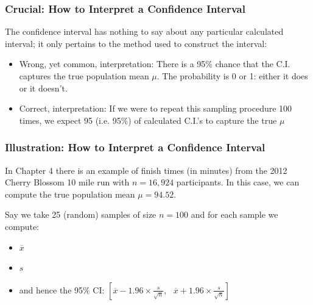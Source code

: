 \documentclass[handout]{beamer}
\newcommand{\blue}[1]{\textcolor{blue2}{#1}}
\newcommand{\xbar}{\overline{x}}
\begin{document}
\begin{frame}
\frametitle{Crucial: How to Interpret a Confidence Interval}
The confidence interval has nothing to say about any particular calculated interval; it only pertains to the \blue{method} used to construct the interval:
\vskip 0.25cm
\begin{itemize}
\pause \item\blue{Wrong, yet common, interpretation}:  There is a 95\% chance that the C.I. captures the true population mean $\mu$.  The probability is 0 or 1: either it does or it doesn't.  
\pause \item\blue{Correct, interpretation}:  If we were to repeat this sampling procedure 100 times, we expect 95 (i.e. 95\%) of calculated C.I.'s to capture the true $\mu$
\end{itemize}
 
\end{frame}


\begin{frame}
\frametitle{Illustration:  How to Interpret a Confidence Interval}
In Chapter 4 there is an example of finish times (in minutes) from the 2012 Cherry Blossom 10 mile run with $n=16,924$ participants.  In this case, we can compute the \blue{true} population mean $\mu=94.52$.

\vspace{0.5cm}

\pause Say we take 25 (random) samples of size $n=100$ and for each sample we compute:
\begin{itemize}
\item $\xbar$
\item $s$
\item and hence the 95\% CI:  $\left[
\overline{x} - 1.96 \times\frac{s}{\sqrt n}, \mbox{  }
\overline{x} + 1.96 \times\frac{s}{\sqrt n}
\right]$
\end{itemize}
\end{frame}
\end{document}
